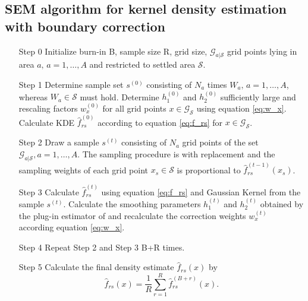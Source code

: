 \subsection{SEM algorithm for kernel density estimation with boundary correction}
\begin{itemize}
    \item[Step 0] Initialize burn-in B, sample size R, grid size, $\mathcal{G}_{a|\mathcal{S}}$ grid points lying in area $a,\, a = 1, \dots, A$ and restricted to settled area $\mathcal{S}$.
    \item[Step 1] Determine sample set $s^{(0)}$ consisting of $N_a$ times $W_a,\, a = 1, \dots,A$, whereas $W_a \in \mathcal{S}$ must hold. Determine $h_1^{(0)}$ and $h_2^{(0)}$ sufficiently large and rescaling factors $w_x^{(0)}$ for all grid points $x \in \mathcal{G}_{\mathcal{S}}$ using equation \ref{eq:w_x}. Calculate KDE $\hat{f}_{rs}^{(0)}$ according to equation \ref{eq:f_rs} for $x \in \mathcal{G}_{\mathcal{S}}$. 
    \item[Step 2] Draw a sample $s^{(t)}$ consisting of $N_a$ grid points of the set $\mathcal{G}_{a|\mathcal{S}}, a = 1, \dots, A$. The sampling procedure is with replacement and the sampling weights of each grid point $x_s \in \mathcal{S}$ is proportional to $\hat{f}_{rs}^{(t-1)}(x_s)$. 
    \item[Step 3] Calculate $\hat{f}_{rs}^{(t)}$ using equation \ref{eq:f_rs} and Gaussian Kernel from the sample $s^{(t)}$. Calculate the smoothing parameters $h_1^{(t)}$ and $h_2^{(t)}$ obtained by the plug-in estimator of \cite{Wand94} and recalculate the correction weights $w_x^{(t)}$ according equation \ref{eq:w_x}. 
    \item[Step 4] Repeat Step 2 and Step 3 B+R times. 
    \item[Step 5] Calculate the final density estimate $\hat{f}_{rs}(x)$ by
    $$ \hat{f}_{rs}(x) = \frac{1}{R} \sum_{r = 1}^R \hat{f}_{rs}^{(B+r)}(x).$$
\end{itemize}

